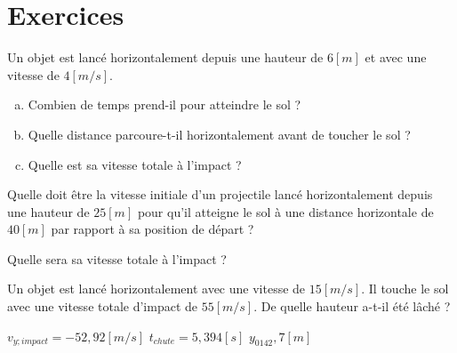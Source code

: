 
\section{Exercices}
\begin{exercise}
    Un objet est lancé horizontalement depuis une hauteur de \(6[m]\) et avec une vitesse de \(4[m/s]\).
    \begin{enumerate}[a)]
        \item Combien de temps prend-il pour atteindre le sol ?
        \item Quelle distance parcoure-t-il horizontalement avant de toucher le sol ?
        \item Quelle est sa vitesse totale à l'impact ?
    \end{enumerate}
\end{exercise}

\begin{exercise}
    Quelle doit être la vitesse initiale d'un projectile lancé horizontalement depuis une hauteur de \(25[m]\) pour qu'il atteigne le sol à une distance horizontale de \(40[m]\) par rapport à sa position de départ ?

    Quelle sera sa vitesse totale à l'impact ?
\end{exercise}

\begin{exercise}
    Un objet est lancé horizontalement avec une vitesse de \(15[m/s]\). Il touche le sol avec une vitesse totale d'impact de \(55[m/s]\). De quelle hauteur a-t-il été lâché ?
\end{exercise}
\begin{solution}
    \(v_{y ; impact}=-52,92[m/s]\)
    \(t_{chute}=5,394[s]\)
    \(y_0142,7[m]\)
\end{solution}

